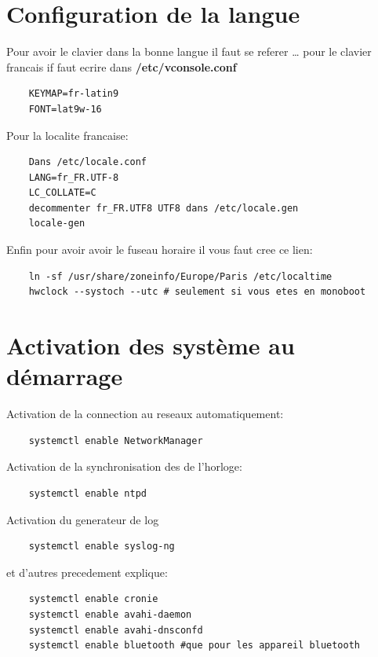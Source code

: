 \documentclass[a4paper]{book}
\begin{document}
  \chapter{Configuration de la langue}
  Pour avoir le clavier dans la bonne langue il faut se referer \ldots
  pour le clavier francais if faut ecrire dans \textbf{/etc/vconsole.conf}
  \\
  \begin{lstlisting}
    KEYMAP=fr-latin9
    FONT=lat9w-16
  \end{lstlisting}
  Pour la localite francaise\@:\\
  \begin{lstlisting}
    Dans /etc/locale.conf
    LANG=fr_FR.UTF-8
    LC_COLLATE=C
    decommenter fr_FR.UTF8 UTF8 dans /etc/locale.gen
    locale-gen
  \end{lstlisting}
  Enfin pour avoir avoir le fuseau horaire il vous faut cree ce lien\@:\\
  \begin{lstlisting}
    ln -sf /usr/share/zoneinfo/Europe/Paris /etc/localtime
    hwclock --systoch --utc # seulement si vous etes en monoboot
  \end{lstlisting}
  \chapter{Activation des système au démarrage}
  Activation de la connection au reseaux automatiquement\@:\\
  \begin{lstlisting}
    systemctl enable NetworkManager
  \end{lstlisting}
  Activation de la synchronisation des de l'horloge\@:\\
  \begin{lstlisting}
    systemctl enable ntpd
  \end{lstlisting}
  Activation du  generateur de log\\
  \begin{lstlisting}
    systemctl enable syslog-ng
  \end{lstlisting}
  et d'autres precedement explique\@:\\
  \begin{lstlisting}
    systemctl enable cronie
    systemctl enable avahi-daemon
    systemctl enable avahi-dnsconfd
    systemctl enable bluetooth #que pour les appareil bluetooth
  \end{lstlisting}
\end{document}

